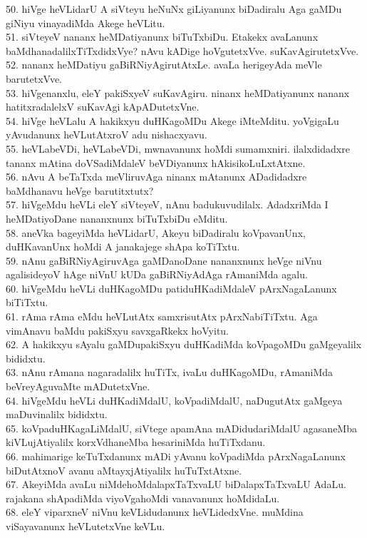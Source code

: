 \documentclass{article}
\begin{document}
50. hiVge heVLidarU A siVteyu heNuNx giLiyanunx biDadiralu Aga  gaMDu giNiyu vinayadiMda Akege heVLitu.\\
51. siVteyeV nananx heMDatiyanunx biTuTxbiDu. Etakekx avaLanunx baMdhanadalilxTiTxdidxVye? nAvu kADige hoVgutetxVve. suKavAgirutetxVve.\\
52. nananx heMDatiyu gaBiRNiyAgirutAtxLe. avaLa herigeyAda meVle barutetxVve.\\
53. hiVgenanxlu, eleY pakiSxyeV suKavAgiru. ninanx heMDatiyanunx nananx hatitxradalelxV suKavAgi kApADutetxVne.\\
54. hiVge heVLalu A hakikxyu duHKagoMDu Akege iMteMditu. yoVgigaLu yAvudanunx heVLutAtxroV adu nishacxyavu.\\
55. heVLabeVDi, heVLabeVDi, mwnavanunx hoMdi sumamxniri. ilalxdidadxre tananx mAtina doVSadiMdaleV beVDiyanunx hAkisikoLuLxtAtxne.\\
56. nAvu A beTaTxda meVliruvAga ninanx mAtanunx ADadidadxre baMdhanavu heVge barutitxtutx?\\
57. hiVgeMdu heVLi eleY siVteyeV, nAnu badukuvudilalx. AdadxriMda I heMDatiyoDane nananxnunx biTuTxbiDu eMditu.\\
58. aneVka bageyiMda heVLidarU, Akeyu biDadiralu koVpavanUnx, duHKavanUnx hoMdi A janakajege shApa koTiTxtu.\\
59. nAnu gaBiRNiyAgiruvAga gaMDanoDane nananxnunx heVge niVnu agalisideyoV hAge niVnU kUDa gaBiRNiyAdAga rAmaniMda agalu.\\
60. hiVgeMdu heVLi duHKagoMDu patiduHKadiMdaleV pArxNagaLanunx biTiTxtu.\\
61. rAma rAma eMdu heVLutAtx samxrisutAtx pArxNabiTiTxtu. Aga vimAnavu baMdu pakiSxyu savxgaRkekx hoVyitu.\\
62. A hakikxyu sAyalu gaMDupakiSxyu duHKadiMda koVpagoMDu gaMgeyalilx bididxtu.\\
63. nAnu rAmana nagaradalilx huTiTx, ivaLu duHKagoMDu, rAmaniMda beVreyAguvaMte mADutetxVne.\\
64. hiVgeMdu heVLi duHKadiMdalU, koVpadiMdalU, naDugutAtx gaMgeya maDuvinalilx bididxtu.\\
65. koVpaduHKagaLiMdalU, siVtege apamAna mADidudariMdalU agasaneMba kiVLujAtiyalilx korxVdhaneMba hesariniMda huTiTxdanu.\\
66. mahimarige keTuTxdanunx mADi yAvanu koVpadiMda pArxNagaLanunx biDutAtxnoV avanu aMtayxjAtiyalilx huTuTxtAtxne.\\
67. AkeyiMda avaLu niMdehoMdalapxTaTxvaLU biDalapxTaTxvaLU AdaLu. rajakana shApadiMda viyoVgahoMdi vanavanunx hoMdidaLu.\\
68. eleY viparxneV niVnu keVLidudanunx heVLidedxVne. muMdina viSayavanunx heVLutetxVne keVLu.\\
\end{document}
